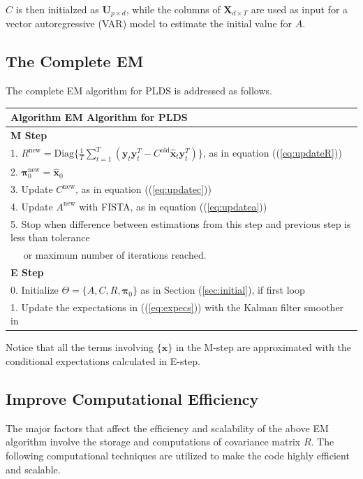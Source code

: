 \documentclass[fleqn]{article}
\let\oldref\ref
\renewcommand{\ref}[1]{(\oldref{#1})}
\newcommand{\T}{T}
\begin{document}
$C$ is then initialzed as $\mathbf{U}_{p\times d}$, while the columns of $\mathbf{X}_{d \times T}$ are used as input for a vector autoregressive (VAR) model to estimate the initial value for $A$.

\subsection{The Complete EM}\label{sec:em}
The complete EM algorithm for PLDS is addressed as follows.\\

\begin{tabular}{l}
\hline
\textbf{Algorithm } EM Algorithm for PLDS\\
\hline
\textbf{M Step}\\
1. $R^{\text{new}}=\text{Diag}\biggl\{\frac{1}{T}\sum\limits_{t=1}^{T}(\mathbf{y}_t\mathbf{y}_t^{\T}-C^{\text{old}} \hat{\mathbf{x}}_t\mathbf{y}_t^{\T})\biggr\}$, as in equation \ref{eq:updateR}\\
2. $\mathbf{\pi}_0^{\text{new}}=\hat{\mathbf{x}}_0$\\
3. Update $C^{\text{new}}$, as in equation \ref{eq:updatec}\\
4. Update $A^{\text{new}}$ with FISTA, as in equation \ref{eq:updatea}\\
5. Stop when difference between estimations from this step and previous step is less than tolerance\\
  $\quad$ or maximum number of iterations reached.\\
\hline
\textbf{E Step}\\
0. Initialize $\Theta =\{A,C,R,\mathbf{\pi}_0\}$ as in Section \oldref{sec:initial}, if first loop\\
1. Update the expectations in \ref{eq:expecs} with the Kalman filter smoother in \nameref{sec:appendix1}\\
\hline
\end{tabular}

Notice that all the terms involving $\{\mathbf{x}\}$ in the M-step are approximated with the conditional expectations calculated in E-step.

\subsection{Improve Computational Efficiency}
The major factors that affect the efficiency and scalability of the above EM algorithm involve the storage and computations of covariance matrix $R$. The following computational techniques are utilized to make the code highly efficient and scalable.
\end{document}
